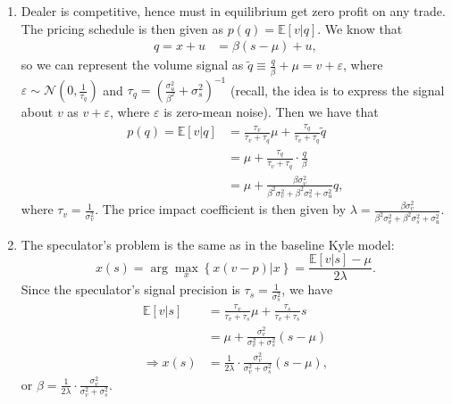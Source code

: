 \documentclass[a4paper]{article}
\begin{document}
\begin{enumerate}
	\item Dealer is competitive, hence must in equilibrium get zero profit on any trade. The pricing schedule is then given as $p(q) = \mathbb{E}[v|q]$. We know that 
	\begin{align*}
		q = x + u 
		&= \beta(s-\mu) + u,
	\end{align*}
	so we can represent the volume signal as $\tilde{q} \equiv \frac{q}{\beta} + \mu = v + \varepsilon$, where $\varepsilon \sim \mathcal{N}\left( 0, \frac{1}{\tau_q} \right)$ and $\tau_q = \left( \frac{\sigma^2_u}{\beta^2} + \sigma^2_s \right)^{-1}$ (recall, the idea is to express the signal about $v$ as $v+\varepsilon$, where $\varepsilon$ is zero-mean noise). Then we have that
	\begin{align*}
		p(q) = \mathbb{E}[v|q] 
		&= \frac{\tau_v}{\tau_v + \tau_q} \mu + \frac{\tau_q}{\tau_v + \tau_q} \tilde{q} 
		\\
		&= \mu + \frac{\tau_q}{\tau_v + \tau_q} \cdot \frac{q}{\beta}
		\\
		&= \mu + \frac{\beta \sigma^2_v}{\beta^2 \sigma^2_v + \beta^2\sigma^2_s + \sigma^2_u} q,
	\end{align*}
	where $\tau_v = \frac{1}{\sigma^2_v}$. The price impact coefficient is then given by $\lambda = \frac{\beta \sigma^2_v}{\beta^2 \sigma^2_v + \beta^2\sigma^2_s + \sigma^2_u}$.
	
	\item The speculator's problem is the same as in the baseline Kyle model: 
	$$x(s) = \arg \max_x \left\{ x(v-p) | x \right\} = \frac{\mathbb{E}[v|s] - \mu}{2\lambda}.$$
	Since the speculator's signal precision is $\tau_s = \frac{1}{\sigma^2_s}$, we have
	\begin{align*}
		\mathbb{E}[v|s] &= \frac{\tau_v}{\tau_v+\tau_s} \mu + \frac{\tau_s}{\tau_v+\tau_s} s
		\\
		&= \mu + \frac{\sigma^2_v}{\sigma^2_v + \sigma^2_s} (s-\mu)
		\\
		\Rightarrow
		x(s) &= \frac{1}{2\lambda} \cdot \frac{\sigma^2_v}{\sigma^2_v + \sigma^2_s} (s-\mu),
	\end{align*}
	or $\beta = \frac{1}{2\lambda} \cdot \frac{\sigma^2_v}{\sigma^2_v + \sigma^2_s}$.
	

\end{enumerate}
\end{document}
